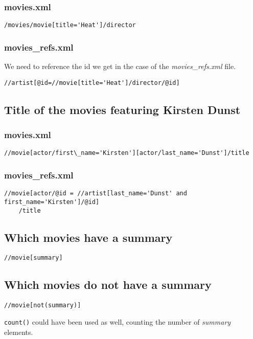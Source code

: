 \documentclass{article}
\begin{document}
\subsubsection{movies.xml}
\begin{verbatim}
/movies/movie[title='Heat']/director
\end{verbatim}
\subsubsection{movies\_refs.xml}
We need to reference the id we get in the case of the \emph{movies\_refs.xml} file.
\begin{verbatim}
//artist[@id=//movie[title='Heat']/director/@id]
\end{verbatim}

\subsection{Title of the movies featuring Kirsten Dunst}
\subsubsection{movies.xml}
\begin{verbatim}
//movie[actor/first\_name='Kirsten'][actor/last_name='Dunst']/title
\end{verbatim}
\subsubsection{movies\_refs.xml}
\begin{verbatim}
//movie[actor/@id = //artist[last_name='Dunst' and first_name='Kirsten']/@id]
	/title
\end{verbatim}

\subsection{Which movies have a summary}
\begin{verbatim}
//movie[summary]
\end{verbatim}

\subsection{Which movies do not have a summary}
\begin{verbatim}
//movie[not(summary)]
\end{verbatim}
\texttt{count()} could have been used as well, counting the number of \emph{summary} elements.
\end{document}
